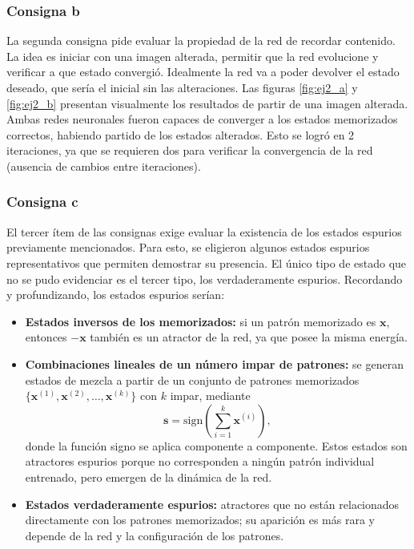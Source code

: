 \documentclass[11pt]{article} %
\begin{document}
\subsubsection{Consigna b}
La segunda consigna pide evaluar la propiedad de la red de recordar contenido. La idea es iniciar con una imagen alterada, permitir que la red evolucione y verificar a que estado convergió. Idealmente la red va a poder devolver el estado deseado, que sería el inicial sin las alteraciones. Las figuras \ref{fig:ej2_a} y \ref{fig:ej2_b} presentan visualmente los resultados de partir de una imagen alterada. Ambas redes neuronales fueron capaces de converger a los estados memorizados correctos, habiendo partido de los estados alterados. Esto se logró en 2 iteraciones, ya que se requieren dos para verificar la convergencia de la red (ausencia de cambios entre iteraciones).
\subsubsection{Consigna c}
El tercer ítem de las consignas exige evaluar la existencia de los estados espurios previamente mencionados. Para esto, se eligieron algunos estados espurios representativos que permiten demostrar su presencia. El único tipo de estado que no se pudo evidenciar es el tercer tipo, los verdaderamente espurios. Recordando y profundizando, los estados espurios serían:

\begin{itemize}
\item \textbf{Estados inversos de los memorizados:} si un patrón memorizado es $\mathbf{x}$, entonces $-\mathbf{x}$ también es un atractor de la red, ya que posee la misma energía.
\item \textbf{Combinaciones lineales de un número impar de patrones:} se generan estados de mezcla a partir de un conjunto de patrones memorizados $\{\mathbf{x}^{(1)}, \mathbf{x}^{(2)}, \dots, \mathbf{x}^{(k)}\}$ con $k$ impar, mediante
\[
\mathbf{s} = \mathrm{sign}\left(\sum_{i=1}^{k} \mathbf{x}^{(i)}\right),
\]
donde la función signo se aplica componente a componente. Estos estados son atractores espurios porque no corresponden a ningún patrón individual entrenado, pero emergen de la dinámica de la red.
\item \textbf{Estados verdaderamente espurios:} atractores que no están relacionados directamente con los patrones memorizados; su aparición es más rara y depende de la red y la configuración de los patrones.
\end{itemize}
\end{document}
